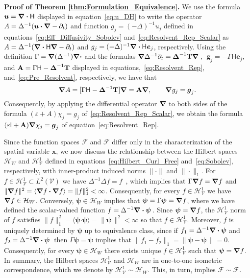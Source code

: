 \documentclass[leqno,onefignum,onetabnum]{siamltex1213}
\newcommand{\Tb}{\mathbf{T}}
\newcommand{\Ab}{\mathbf{A}}
\newcommand{\Vc}{\mathcal{V}}
\newcommand{\Hc}{\mathcal{H}}
\newcommand{\Fc}{\mathcal{F}}
\newcommand{\Hm}{\mathsf{H}}
\newcommand{\Ib}{\mathsf{I}}
\newcommand{\Hs}{\mathscr{H}}
\newcommand{\Fs}{\mathscr{F}}
\newcommand\bDelta{\mbox{\boldmath${\Delta}$}}
\newcommand\bnabla{\mbox{\boldmath${\nabla}$}}
\providecommand\bcdot{\boldsymbol{\cdot}}
\newcommand{\vecg}{\boldsymbol{g}}
\newcommand{\vecx}{\boldsymbol{x}}
\newcommand{\vecu}{\boldsymbol{u}}
\newcommand{\vece}{\boldsymbol{e}}
\newcommand{\vecpsi}{\boldsymbol{\psi}}
\begin{document}
\textbf{Proof of Theorem \ref{thm:Formulation_Equivalence}.}\hspace{1ex}
%
We use the formula $\vecu =\bnabla \bcdot\Hm$ displayed in
equation~\eqref{eq:u_DH} to write the operator $A=\Delta^{-1}(\vecu
\bcdot\bnabla -\partial_t)$ 
and function $g_j=(-\Delta)^{-1}u_j$ defined in
equations~\eqref{eq:Eff_Diffusivity_Sobolev}
and~\eqref{eq:Resolvent_Rep_Scalar} 
as $A=\Delta^{-1}(\bnabla \bcdot\Hm\bnabla -\partial_t)$ and
$g_j=(-\Delta)^{-1}\bnabla \bcdot\Hm\vece _j$, respectively. Using the definition
$\Gamma=\bnabla (\Delta^{-1})\bnabla \bcdot$ and the formulas
$\bnabla \Delta^{-1}\partial_t=\bDelta^{-1}\Tb\bnabla \,$,
$\;\vecg_j=-\Gamma\Hm\vece _j$, and $\Ab=\Gamma\Hm-\bDelta^{-1}\Tb$
displayed in equations,~\eqref{eq:Resolvent_Rep},
and~\eqref{eq:Pre_Resolvent}, respectively, we have that    
%
\begin{align}\label{eq:A_Ab_Relation}
  \bnabla A=[\Gamma\Hm-\bDelta^{-1}\Tb]\bnabla =\Ab\bnabla , \qquad
  \bnabla g_j=\vecg_j.
\end{align}
%
Consequently, by applying the
differential operator $\bnabla $ to both sides of the formula
$(\varepsilon+A)\chi_j=g_j$ of~\eqref{eq:Resolvent_Rep_Scalar}, we obtain the
formula  $(\varepsilon\Ib+\Ab)\bnabla \chi_j=\vecg_j$ of
equation~\eqref{eq:Resolvent_Rep}. 



Since the function spaces $\Fs$ and $\Fc$ differ
only in the characterization of the spatial variable $\vecx$, we now
discuss the relationship between the Hilbert spaces $\Hc_W$ and
$\Hs^1_{\Vc}$ defined in equations~\eqref{eq:Hilbert_Curl_Free}
and~\eqref{eq:Sobolev}, respectively, with inner-product induced norms 
$\|\cdot\|$ and $\|\cdot\|_1$. For $f\in\Hs^1_{\Vc}\subset L^2(\Vc)$ we have 
$\Delta^{-1}\Delta f=f$~\cite{Stakgold:BVP:2000}, which implies that
$\Gamma\bnabla f=\bnabla f$ and
$\|\bnabla f\|^2=\langle\bnabla f\bcdot\bnabla f\rangle=\|f\|_1^2<\infty$. Consequently, for every  
$f\in\Hs^1_{\Vc}$ we have $\bnabla f\in\Hc_W$. Conversely,
$\vecpsi\in\Hc_W$ implies that $\vecpsi=\Gamma\vecpsi=\bnabla f$, where
we have defined the scalar-valued function
$f=\Delta^{-1}\bnabla \bcdot\vecpsi\,$. Since $\vecpsi=\bnabla f$, the
$\Hs^1_{\Vc}$ norm of $f$ satisfies
$\|f\|_1^2=\langle\vecpsi\bcdot\vecpsi\rangle=\|\vecpsi\,\|^2<\infty$ so that
$f\in\Hs^1_{\Vc}$. Moreover, $f$ is uniquely determined by $\vecpsi$ up
to equivalence class, since if $f_1=\Delta^{-1}\bnabla \bcdot\vecpsi$ and
$f_2=\Delta^{-1}\bnabla \bcdot\vecpsi\,$ then $\Gamma\vecpsi=\vecpsi$ implies
that $\|f_1-f_2\|_1=\|\vecpsi-\vecpsi\,\|=0$. Consequently, for every  
$\vecpsi\in\Hc_W$ there exists unique $f\in\Hs^1_{\Vc}$ such that
$\vecpsi=\bnabla f$.  In summary, the Hilbert spaces $\Hs^1_{\Vc}$ and
$\Hc_W$ are in one-to-one isometric correspondence, which we denote by
$\Hs^1_{\Vc}\sim\Hc_W$. This, in turn, implies  $\Fs\sim\Fc$.  
\end{document}
